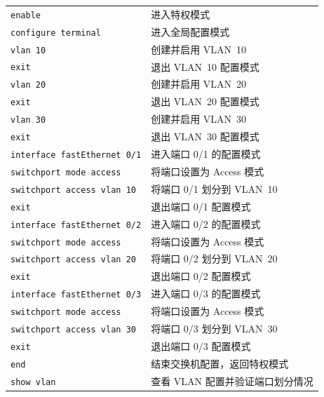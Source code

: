 \documentclass[UTF8,12pt,a4paper]{ctexart}
\begin{document}
\begin{tabular}{p{6cm} p{8cm}}
\texttt{enable} & 进入特权模式 \\

\texttt{configure terminal} & 进入全局配置模式 \\

\texttt{vlan 10} & 创建并启用 VLAN~10 \\

\texttt{exit} & 退出 VLAN~10 配置模式 \\

\texttt{vlan 20} & 创建并启用 VLAN~20 \\

\texttt{exit} & 退出 VLAN~20 配置模式 \\

\texttt{vlan 30} & 创建并启用 VLAN~30 \\

\texttt{exit} & 退出 VLAN~30 配置模式 \\

\texttt{interface fastEthernet 0/1} & 进入端口 0/1 的配置模式 \\

\texttt{switchport mode access} & 将端口设置为 Access 模式 \\

\texttt{switchport access vlan 10} & 将端口 0/1 划分到 VLAN~10 \\

\texttt{exit} & 退出端口 0/1 配置模式 \\

\texttt{interface fastEthernet 0/2} & 进入端口 0/2 的配置模式 \\

\texttt{switchport mode access} & 将端口设置为 Access 模式 \\

\texttt{switchport access vlan 20} & 将端口 0/2 划分到 VLAN~20 \\

\texttt{exit} & 退出端口 0/2 配置模式 \\

\texttt{interface fastEthernet 0/3} & 进入端口 0/3 的配置模式 \\

\texttt{switchport mode access} & 将端口设置为 Access 模式 \\

\texttt{switchport access vlan 30} & 将端口 0/3 划分到 VLAN~30 \\

\texttt{exit} & 退出端口 0/3 配置模式 \\

\texttt{end} & 结束交换机配置，返回特权模式 \\

\texttt{show vlan} & 查看 VLAN 配置并验证端口划分情况 \\
\end{tabular}
\end{document}
